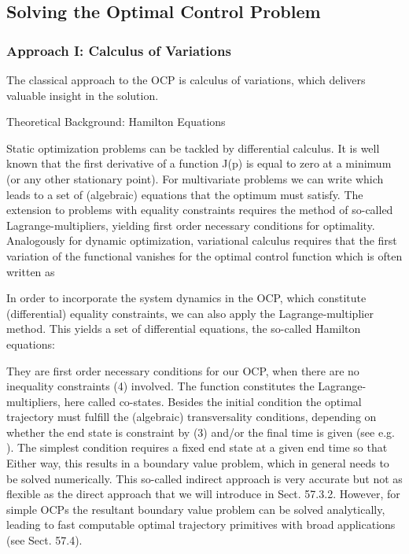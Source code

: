 \subsection{Solving the Optimal Control Problem}

\subsubsection{Approach I: Calculus of Variations}
The classical approach to the OCP is calculus of variations, which delivers valuable insight in the solution. 

Theoretical Background: Hamilton Equations

Static optimization problems can be tackled by differential calculus. It is well known that the first derivative of a function J(p) is equal to zero at a minimum (or any other stationary point). For multivariate problems we can write 
which leads to a set of (algebraic) equations that the optimum 
must satisfy. The extension to problems with equality constraints requires the method of so-called Lagrange-multipliers, yielding first order necessary conditions for optimality.
Analogously for dynamic optimization, variational calculus requires that the first variation of the functional %
vanishes for the optimal control function %
which is often written as 

In order to incorporate the system dynamics in the OCP, which constitute (differential) equality constraints, we can also apply the Lagrange-multiplier method. This yields a set of differential equations, the so-called Hamilton equations:


They are first order necessary conditions for our OCP, when there are no inequality constraints (4) involved. The function 
constitutes the Lagrange-multipliers, here called co-states. Besides the initial condition
the optimal trajectory must fulfill the (algebraic) transversality conditions, depending on whether the end state 
is constraint by (3) and/or the final time 
is given (see e.g. \cite{Lewis_OC}). The simplest condition requires a fixed end state 
at a given end time 
so that
Either way, this results in a boundary value problem, which in general needs to be solved numerically. This so-called indirect approach is very accurate but not as flexible as the direct approach that we will introduce in Sect. 57.3.2. However, for simple OCPs the resultant boundary value problem can be solved analytically, leading to fast computable optimal trajectory primitives with broad applications (see Sect. 57.4).

